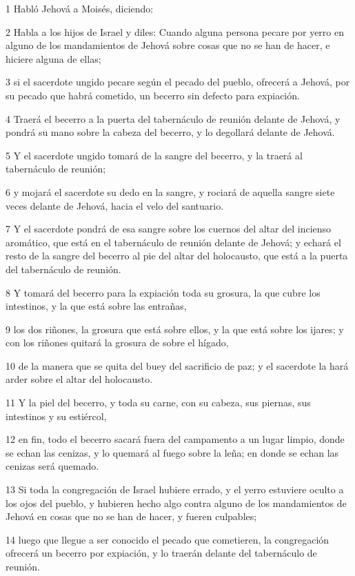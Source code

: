 \par 1 Habló Jehová a Moisés, diciendo:
\par 2 Habla a los hijos de Israel y diles: Cuando alguna persona pecare por yerro en alguno de los mandamientos de Jehová sobre cosas que no se han de hacer, e hiciere alguna de ellas;
\par 3 si el sacerdote ungido pecare según el pecado del pueblo, ofrecerá a Jehová, por su pecado que habrá cometido, un becerro sin defecto para expiación.
\par 4 Traerá el becerro a la puerta del tabernáculo de reunión delante de Jehová, y pondrá su mano sobre la cabeza del becerro, y lo degollará delante de Jehová.
\par 5 Y el sacerdote ungido tomará de la sangre del becerro, y la traerá al tabernáculo de reunión;
\par 6 y mojará el sacerdote su dedo en la sangre, y rociará de aquella sangre siete veces delante de Jehová, hacia el velo del santuario.
\par 7 Y el sacerdote pondrá de esa sangre sobre los cuernos del altar del incienso aromático, que está en el tabernáculo de reunión delante de Jehová; y echará el resto de la sangre del becerro al pie del altar del holocausto, que está a la puerta del tabernáculo de reunión.
\par 8 Y tomará del becerro para la expiación toda su grosura, la que cubre los intestinos, y la que está sobre las entrañas,
\par 9 los dos riñones, la grosura que está sobre ellos, y la que está sobre los ijares; y con los riñones quitará la grosura de sobre el hígado,
\par 10 de la manera que se quita del buey del sacrificio de paz; y el sacerdote la hará arder sobre el altar del holocausto.
\par 11 Y la piel del becerro, y toda su carne, con su cabeza, sus piernas, sus intestinos y su estiércol,
\par 12 en fin, todo el becerro sacará fuera del campamento a un lugar limpio, donde se echan las cenizas, y lo quemará al fuego sobre la leña; en donde se echan las cenizas será quemado.
\par 13 Si toda la congregación de Israel hubiere errado, y el yerro estuviere oculto a los ojos del pueblo, y hubieren hecho algo contra alguno de los mandamientos de Jehová en cosas que no se han de hacer, y fueren culpables;
\par 14 luego que llegue a ser conocido el pecado que cometieren, la congregación ofrecerá un becerro por expiación, y lo traerán delante del tabernáculo de reunión.
